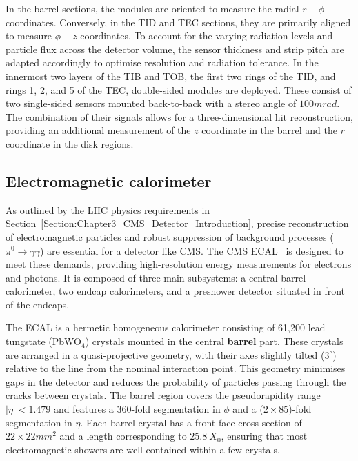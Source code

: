 In the barrel sections, the modules are oriented to measure the radial $r-\phi$ coordinates. Conversely, in the TID and TEC sections, they are primarily aligned to measure $\phi-z$ coordinates. To account for the varying radiation levels and particle flux across the detector volume, the sensor thickness and strip pitch are adapted accordingly to optimise resolution and radiation tolerance. In the innermost two layers of the TIB and TOB, the first two rings of the TID, and rings 1, 2, and 5 of the TEC, double-sided modules are deployed. These consist of two single-sided sensors mounted back-to-back with a stereo angle of $100\unit{mrad}$. The combination of their signals allows for a three-dimensional hit reconstruction, providing an additional measurement of the $z$ coordinate in the barrel and the $r$ coordinate in the disk regions.

\subsection{Electromagnetic calorimeter}

As outlined by the LHC physics requirements in Section~\ref{Section:Chapter3_CMS_Detector_Introduction}, precise reconstruction of electromagnetic particles and robust suppression of background processes ($\pi^0 \to \gamma \gamma$) are essential for a detector like CMS. The CMS ECAL~\cite{LHC_CMS,CMS_Detector_Run3,CMS_ECAL_Performance_Run2} is designed to meet these demands, providing high-resolution energy measurements for electrons and photons. It is composed of three main subsystems: a central barrel calorimeter, two endcap calorimeters, and a preshower detector situated in front of the endcaps.

The ECAL is a hermetic homogeneous calorimeter consisting of 61,200 lead tungstate (PbWO$_4$) crystals mounted in the central \textbf{barrel} part. These crystals are arranged in a quasi-projective geometry, with their axes slightly tilted ($3^\circ$) relative to the line from the nominal interaction point. This geometry minimises gaps in the detector and reduces the probability of particles passing through the cracks between crystals. The barrel region covers the pseudorapidity range $|\eta| < 1.479$ and features a 360-fold segmentation in $\phi$ and a ($2 \times 85$)-fold segmentation in $\eta$. Each barrel crystal has a front face cross-section of $22 \times 22\unit{mm}^2$ and a length corresponding to $25.8~X_0$, ensuring that most electromagnetic showers are well-contained within a few crystals.

